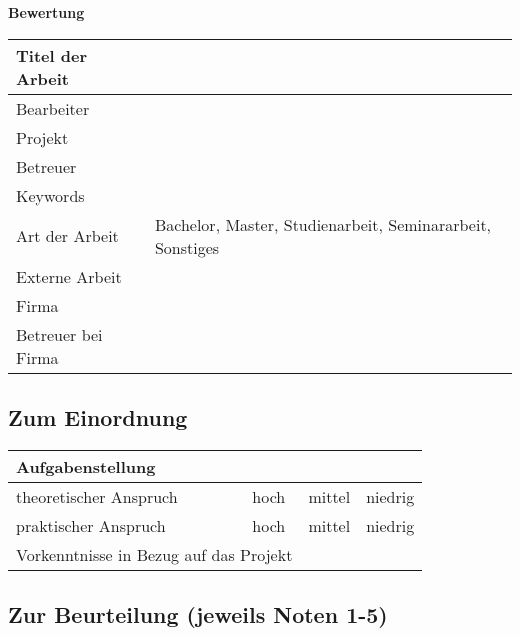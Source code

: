 \documentclass[german,a4paper]{article}
\begin{document}
\begin{center}
  {\bf \large Bewertung}
\end{center}


\begin{tabular}{|l|p{.6\linewidth}|}
\hline
 Titel der Arbeit & \\\hline%
 Bearbeiter & \\\hline
 Projekt & \\\hline
 Betreuer & \\\hline
 Keywords & \\\hline

 Art der Arbeit & Bachelor, Master, Studienarbeit, Seminararbeit, Sonstiges\\\hline
\multicolumn{2}{l}{Externe Arbeit}\\\hline
  Firma& \\\hline
  Betreuer bei Firma& \\\hline

\end{tabular}



\subsection*{Zum Einordnung}
\begin{tabular}{|l|c|c|c|}
\hline  \multicolumn{4}{|l|}{Aufgabenstellung}\\\hline
 theoretischer Anspruch&  hoch & mittel & niedrig\\\hline
 praktischer Anspruch&  hoch & mittel & niedrig\\\hline
\multicolumn{2}{|l|}{Vorkenntnisse in Bezug auf das Projekt}&\multicolumn{2}{|l|}{}\\\hline
\end{tabular}




\subsection*{Zur Beurteilung (jeweils Noten 1-5)}
\end{document}
